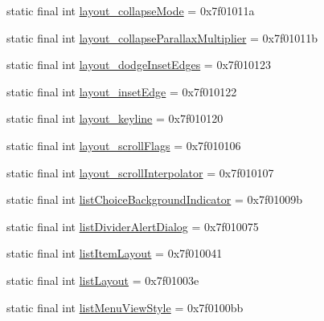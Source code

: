 \begin{CompactItemize}
\item 
static final int \hyperlink{classandroid_1_1support_1_1graphics_1_1drawable_1_1animated_1_1_r_1_1attr_17f1cf0da13b69754b2dc5c996bf02bf}{layout\_\-collapseMode} = 0x7f01011a
\item 
static final int \hyperlink{classandroid_1_1support_1_1graphics_1_1drawable_1_1animated_1_1_r_1_1attr_e6a3acae3a08b57def4857596d91444c}{layout\_\-collapseParallaxMultiplier} = 0x7f01011b
\item 
static final int \hyperlink{classandroid_1_1support_1_1graphics_1_1drawable_1_1animated_1_1_r_1_1attr_1a54d0173e57f28454df62031200524a}{layout\_\-dodgeInsetEdges} = 0x7f010123
\item 
static final int \hyperlink{classandroid_1_1support_1_1graphics_1_1drawable_1_1animated_1_1_r_1_1attr_b91b5189a3d923139a00d46bed45aedd}{layout\_\-insetEdge} = 0x7f010122
\item 
static final int \hyperlink{classandroid_1_1support_1_1graphics_1_1drawable_1_1animated_1_1_r_1_1attr_ab80ad28577eee78dd8ec7897ff5a1c5}{layout\_\-keyline} = 0x7f010120
\item 
static final int \hyperlink{classandroid_1_1support_1_1graphics_1_1drawable_1_1animated_1_1_r_1_1attr_9818a4245d70c10586906b76500dec8d}{layout\_\-scrollFlags} = 0x7f010106
\item 
static final int \hyperlink{classandroid_1_1support_1_1graphics_1_1drawable_1_1animated_1_1_r_1_1attr_dc8d41cc769da401537d14c50cbd5109}{layout\_\-scrollInterpolator} = 0x7f010107
\item 
static final int \hyperlink{classandroid_1_1support_1_1graphics_1_1drawable_1_1animated_1_1_r_1_1attr_6f8968dd3943a20d86455d3a31a3ce7a}{listChoiceBackgroundIndicator} = 0x7f01009b
\item 
static final int \hyperlink{classandroid_1_1support_1_1graphics_1_1drawable_1_1animated_1_1_r_1_1attr_7989bc510bd607508dcd1ae805e36a51}{listDividerAlertDialog} = 0x7f010075
\item 
static final int \hyperlink{classandroid_1_1support_1_1graphics_1_1drawable_1_1animated_1_1_r_1_1attr_df1e2ee90394c9ffa2d58813805b7275}{listItemLayout} = 0x7f010041
\item 
static final int \hyperlink{classandroid_1_1support_1_1graphics_1_1drawable_1_1animated_1_1_r_1_1attr_9dac64fd3755f57dada2667ad10a2924}{listLayout} = 0x7f01003e
\item 
static final int \hyperlink{classandroid_1_1support_1_1graphics_1_1drawable_1_1animated_1_1_r_1_1attr_a5e5fd3a2703f6cc4779b7eee4fc272b}{listMenuViewStyle} = 0x7f0100bb

\end{CompactItemize}
